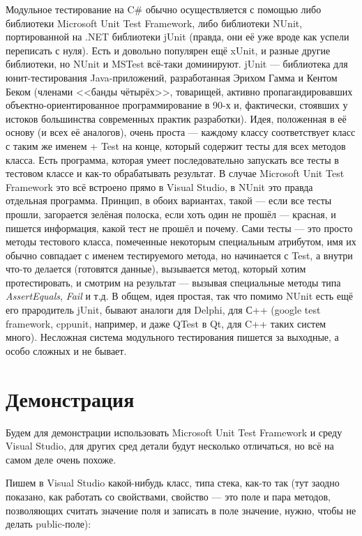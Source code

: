 \documentclass[a5paper]{article}
\begin{document}
Модульное тестирование на C\# обычно осуществляется с помощью либо библиотеки Microsoft Unit Test Framework, либо библиотеки NUnit, портированной на .NET библиотеки jUnit (правда, они её уже вроде как успели переписать с нуля). Есть и довольно популярен ещё xUnit, и разные другие библиотеки, но NUnit и MSTest всё-таки доминируют. jUnit --- библиотека для юнит-тестирования Java-приложений, разработанная Эрихом Гамма и Кентом Беком (членами <<банды чётырёх>>, товарищей, активно пропагандировавших объектно-ориентированное программирование в 90-х и, фактически, стоявших у истоков большинства современных практик разработки). Идея, положенная в её основу (и всех её аналогов), очень проста --- каждому классу соответствует класс с таким же именем + Test на конце, который содержит тесты для всех методов класса. Есть программа, которая умеет последовательно запускать все тесты в тестовом классе и как-то обрабатывать результат. В случае Microsoft Unit Test Framework это всё встроено прямо в Visual Studio, в NUnit это правда отдельная программа. Принцип, в обоих вариантах, такой --- если все тесты прошли, загорается зелёная полоска, если хоть один не прошёл --- красная, и пишется информация, какой тест не прошёл и почему. Сами тесты --- это просто методы тестового класса, помеченные некоторым специальным атрибутом, имя их обычно совпадает с именем тестируемого метода, но начинается с Test, а внутри что-то делается (готовятся данные), вызывается метод, который хотим протестировать, и смотрим на результат --- вызывая специальные методы типа \textit{AssertEquals}, \textit{Fail} и т.д. В общем, идея простая, так что помимо NUnit есть ещё его прародитель jUnit, бывают аналоги для Delphi, для С++ (google test framework, cppunit, например, и даже QTest в Qt, для C++ таких систем много). Несложная система модульного тестирования пишется за выходные, а особо сложных и не бывает.

\section{Демонстрация}

Будем для демонстрации использовать Microsoft Unit Test Framework и среду Visual Studio, для других сред детали будут несколько отличаться, но всё на самом деле очень похоже.

Пишем в Visual Studio какой-нибудь класс, типа стека, как-то так (тут заодно показано, как работать со свойствами, свойство --- это поле и пара методов, позволяющих считать значение поля и записать в поле значение, нужно, чтобы не делать public-поле):
\end{document}
